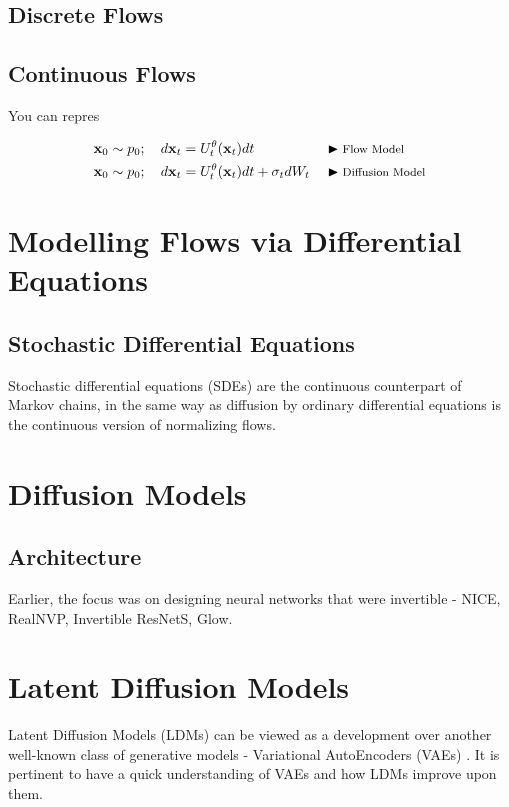\documentclass[a4paper, 11pt]{article}
\begin{document}
\subsection{Discrete Flows}

\subsection{Continuous Flows}

You can repres

\begin{align}
    \mbox{$\mbox{$\mathbf{x}$}$}_0 \sim p_0; \quad d\mbox{$\mbox{$\mathbf{x}$}$}_t &= U_t^{\theta}(\mbox{$\mbox{$\mathbf{x}$}$}_t) dt &&\blacktriangleright\text{\footnotesize Flow Model} \\
    \mbox{$\mbox{$\mathbf{x}$}$}_0 \sim p_0; \quad d\mbox{$\mbox{$\mathbf{x}$}$}_t &= U_t^{\theta}(\mbox{$\mbox{$\mathbf{x}$}$}_t) dt + \sigma_t dW_t && \blacktriangleright\text{\footnotesize Diffusion Model}
\end{align}


\section{Modelling Flows via Differential Equations}

\subsection{Stochastic Differential Equations}
Stochastic differential equations (SDEs) are the continuous counterpart of Markov chains, in the same way
as diffusion by ordinary differential equations is the continuous version of normalizing flows.

\section{Diffusion Models}


\subsection{Architecture}
Earlier, the focus was on designing neural networks that were invertible - NICE, RealNVP, Invertible ResNetS, Glow.

\section{Latent Diffusion Models}

Latent Diffusion Models (LDMs) can be viewed as a development over another well-known class of generative models - Variational AutoEncoders (VAEs) \cite{dieleman2023perspectives}. It is pertinent to have a quick understanding of VAEs and how LDMs improve upon them.
\end{document}

